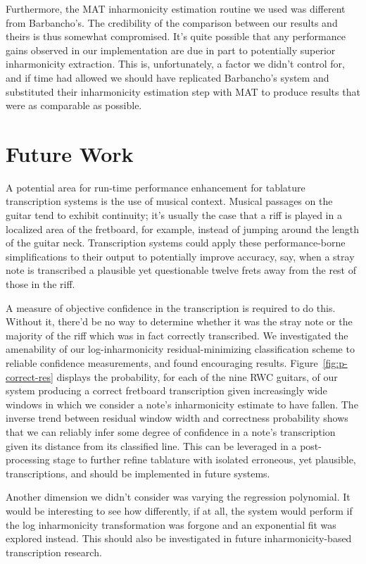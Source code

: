 \documentclass[12pt]{cmuthesis}
\begin{document}
Furthermore, the MAT inharmonicity estimation routine we used was different from Barbancho's. The credibility of the comparison between our results and theirs is thus somewhat compromised. It's quite possible that any performance gains observed in our implementation are due in part to potentially superior inharmonicity extraction. This is, unfortunately, a factor we didn't control for, and if time had allowed we should have replicated Barbancho's system and substituted their inharmonicity estimation step with MAT to produce results that were as comparable as possible.

\section{Future Work}
A potential area for run-time performance enhancement for tablature transcription systems is the use of musical context. Musical passages on the guitar tend to exhibit continuity; it's usually the case that a riff is played in a localized area of the fretboard, for example, instead of jumping around the length of the guitar neck. Transcription systems could apply these performance-borne simplifications to their output to potentially improve accuracy, say, when a stray note is transcribed a plausible yet questionable twelve frets away from the rest of those in the riff.

A measure of objective confidence in the transcription is required to do this. Without it, there'd be no way to determine whether it was the stray note or the majority of the riff which was in fact correctly transcribed. We investigated the amenability of our log-inharmonicity residual-minimizing classification scheme to reliable confidence measurements, and found encouraging results. Figure~\ref{fig:p-correct-res} displays the probability, for each of the nine RWC guitars, of our system producing a correct fretboard transcription given increasingly wide windows in which we consider a note's inharmonicity estimate to have fallen. The inverse trend between residual window width and correctness probability shows that we can reliably infer some degree of confidence in a note's transcription given its distance from its classified line. This can be leveraged in a post-processing stage to further refine tablature with isolated erroneous, yet plausible, transcriptions, and should be implemented in future systems.

Another dimension we didn't consider was varying the regression polynomial. It would be interesting to see how differently, if at all, the system would perform if the log inharmonicity transformation was forgone and an exponential fit was explored instead. This should also be investigated in future inharmonicity-based transcription research.
\end{document}
